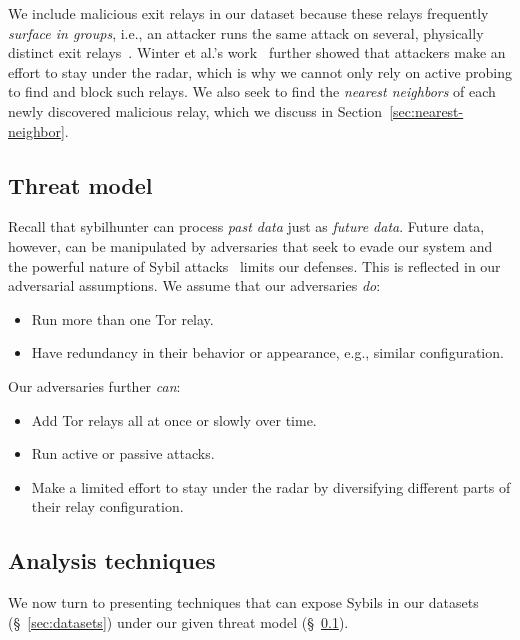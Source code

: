 We include malicious exit relays in our dataset because these relays frequently
\emph{surface in groups}, i.e., an attacker runs the same attack on several,
physically distinct exit relays~\cite{Winter2014a}.  Winter et al.'s
work~\cite[\S 5.2]{Winter2014a} further showed that attackers make an effort to
stay under the radar, which is why we cannot only rely on active probing to find
and block such relays.  We also seek to find the \emph{nearest neighbors} of
each newly discovered malicious relay, which we discuss in
Section~\ref{sec:nearest-neighbor}.

\subsection{Threat model}
\label{sec:threat_model}
Recall that sybilhunter can process \emph{past data} just as \emph{future data}.
Future data, however, can be manipulated by adversaries that seek to evade our
system and the powerful nature of Sybil attacks~\cite{Douceur2002a} limits our
defenses.  This is reflected in our adversarial assumptions.  We assume that our
adversaries \emph{do}:
\begin{itemize}
	\item Run more than one Tor relay.

	\item Have redundancy in their behavior or appearance, e.g., similar
		configuration.
\end{itemize}

Our adversaries further \emph{can}:
\begin{itemize}
	\item Add Tor relays all at once or slowly over time.

	\item Run active or passive attacks.

	\item Make a limited effort to stay under the radar by diversifying
		different parts of their relay configuration.
\end{itemize}


\subsection{Analysis techniques}
\label{sec:techniques}
We now turn to presenting techniques that can expose Sybils in our datasets
(\S~\ref{sec:datasets}) under our given threat model
(\S~\ref{sec:threat_model}).


